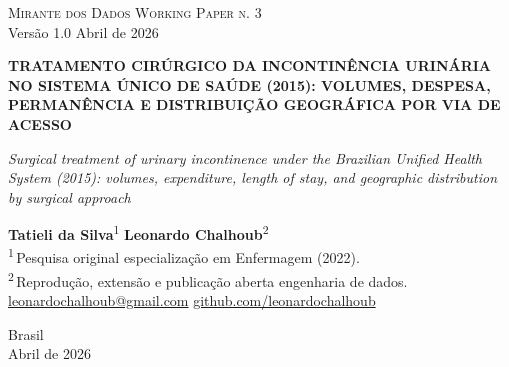 \documentclass[12pt,a4paper,oneside]{article}
\begin{document}
\begin{titlepage}
  \begin{center}
    \vspace*{1.5cm}
    {\small\textsc{Mirante dos Dados \quad\textbar\quad Working Paper n. 3}}\\
    {\small Versão 1.0 \textemdash{} Abril de 2026}

    \vfill

    {\LARGE\bfseries
     TRATAMENTO CIRÚRGICO DA INCONTINÊNCIA URINÁRIA
     NO SISTEMA ÚNICO DE SAÚDE (2015):
     VOLUMES, DESPESA, PERMANÊNCIA E DISTRIBUIÇÃO
     GEOGRÁFICA POR VIA DE ACESSO}

    \vspace{1cm}
    {\large\itshape
     Surgical treatment of urinary incontinence under the Brazilian
     Unified Health System (2015): volumes, expenditure,
     length of stay, and geographic distribution by surgical approach}

    \vfill

    {\large\textbf{Tatieli da Silva}\textsuperscript{1} \quad\textbullet\quad
     \textbf{Leonardo Chalhoub}\textsuperscript{2}}\\[6pt]
    {\small\textsuperscript{1}\,Pesquisa original \textemdash{}
     especialização em Enfermagem (2022).}\\[2pt]
    {\small\textsuperscript{2}\,Reprodução, extensão e publicação aberta
     \textemdash{} engenharia de dados.}\\[6pt]
    {\small\href{mailto:leonardochalhoub@gmail.com}{leonardochalhoub@gmail.com}
     \quad\textbullet\quad
     \href{https://github.com/leonardochalhoub}{github.com/leonardochalhoub}}

    \vfill

    {\small Brasil \\ Abril de 2026}
  \end{center}
\end{titlepage}

\end{document}
